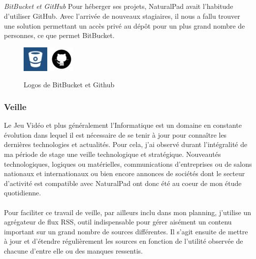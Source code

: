 		\subparagraph{}	\emph{BitBucket et GitHub}
Pour héberger ses projets, NaturalPad avait l'habitude d'utiliser GitHub. Avec l'arrivée de nouveaux stagiaires, il nous a fallu trouver une solution permettant un accès privé au dépôt pour un plus grand nombre de personnes, ce que permet BitBucket.
	\begin{figure}[!h]
		\centering
		\includegraphics[height=48px]{images/bitbucket.jpg}
		\includegraphics[height=48px]{images/github.jpg}
		\caption{Logos de BitBucket et Github}
		\label{Logos de BitBucket et Github}
	\end{figure}

	\subsubsection{Veille}
Le Jeu Vidéo et plus généralement l'Informatique est un domaine en constante évolution dans lequel il est nécessaire de se tenir à jour pour connaître les dernières technologies et actualités. Pour cela, j'ai observé durant l'intégralité de ma période de stage une veille technologique et stratégique. Nouveautés technologiques, logiques ou matérielles, communications d'entreprises ou de salons nationaux et internationaux ou bien encore annonces de sociétés dont le secteur d'activité est compatible avec NaturalPad ont donc été au coeur de mon étude quotidienne.
\paragraph{}Pour faciliter ce travail de veille, par ailleurs inclu dans mon planning, j'utilise un agrégateur de flux RSS, outil indispensable pour gérer aisément un contenu important sur un grand nombre de sources différentes. Il s'agit ensuite de mettre à jour et d'étendre régulièrement les sources en fonction de l'utilité observée de chacune d'entre elle ou des manques ressentis.
